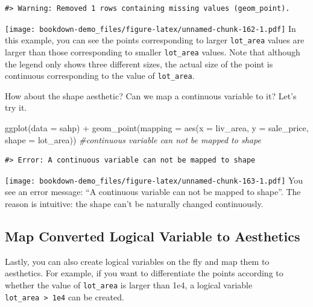\documentclass[
]{book}
\newenvironment{Shaded}{\begin{snugshade}}{\end{snugshade}}
\newcommand{\AttributeTok}[1]{\textcolor[rgb]{0.77,0.63,0.00}{#1}}
\newcommand{\CommentTok}[1]{\textcolor[rgb]{0.56,0.35,0.01}{\textit{#1}}}
\newcommand{\FunctionTok}[1]{\textcolor[rgb]{0.00,0.00,0.00}{#1}}
\newcommand{\NormalTok}[1]{#1}
\newcommand{\SpecialCharTok}[1]{\textcolor[rgb]{0.00,0.00,0.00}{#1}}
\begin{document}
\begin{verbatim}
#> Warning: Removed 1 rows containing missing values (geom_point).
\end{verbatim}

\texttt{[image: bookdown-demo\_files/figure-latex/unnamed-chunk-162-1.pdf]}
In this example, you can see the points corresponding to larger \texttt{lot\_area} values are larger than those corresponding to smaller \texttt{lot\_area} values. Note that although the legend only shows three different sizes, the actual size of the point is continuous corresponding to the value of \texttt{lot\_area}.

How about the shape aesthetic? Can we map a continuous variable to it? Let's try it.

\begin{Shaded}
\begin{Highlighting}[]
\FunctionTok{ggplot}\NormalTok{(}\AttributeTok{data =}\NormalTok{ sahp) }\SpecialCharTok{+} \FunctionTok{geom\_point}\NormalTok{(}\AttributeTok{mapping =} \FunctionTok{aes}\NormalTok{(}\AttributeTok{x =}\NormalTok{ liv\_area, }\AttributeTok{y =}\NormalTok{ sale\_price, }\AttributeTok{shape =}\NormalTok{ lot\_area)) }\CommentTok{\#continuous variable can not be mapped to shape}
\end{Highlighting}
\end{Shaded}

\begin{verbatim}
#> Error: A continuous variable can not be mapped to shape
\end{verbatim}

\texttt{[image: bookdown-demo\_files/figure-latex/unnamed-chunk-163-1.pdf]}
You see an error message: ``A continuous variable can not be mapped to shape''. The reason is intuitive: the shape can't be naturally changed continuously.

\hypertarget{map-converted-logical-variable-to-aesthetics}{%
\subsection{Map Converted Logical Variable to Aesthetics}\label{map-converted-logical-variable-to-aesthetics}}

Lastly, you can also create logical variables on the fly and map them to aesthetics. For example, if you want to differentiate the points according to whether the value of \texttt{lot\_area} is larger than 1e4, a logical variable \texttt{lot\_area\ \textgreater{}\ 1e4} can be created.
\end{document}
